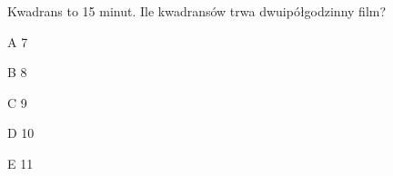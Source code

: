 \begin{tresc}
Kwadrans to 15 minut. Ile kwadransów trwa dwuipółgodzinny film?
\end{tresc}
\begin{wariant}{A} 7 \end{wariant}
\begin{wariant}{B} 8 \end{wariant}
\begin{wariant}{C} 9 \end{wariant}
\begin{wariant}{D} 10 \end{wariant}
\begin{wariant}{E} 11 \end{wariant}
